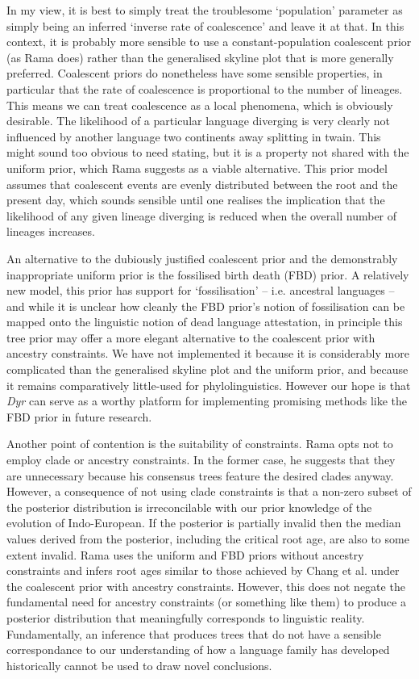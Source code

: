 \documentclass[10pt,journal,compsoc]{IEEEtran}
\begin{document}
In my view, it is best to simply treat the troublesome `population' parameter as simply being an inferred `inverse rate of coalescence' and leave it at that. In this context, it is probably more sensible to use a constant-population coalescent prior (as Rama does) rather than the generalised skyline plot that is more generally preferred. Coalescent priors do nonetheless have some sensible properties, in particular that the rate of coalescence is proportional to the number of lineages. This means we can treat coalescence as a local phenomena, which is obviously desirable. The likelihood of a particular language diverging is very clearly not influenced by another language two continents away splitting in twain. This might sound too obvious to need stating, but it is a property not shared with the uniform prior, which Rama suggests as a viable alternative. This prior model assumes that coalescent events are evenly distributed between the root and the present day, which sounds sensible until one realises the implication that the likelihood of any given lineage diverging is reduced when the overall number of lineages increases.

An alternative to the dubiously justified coalescent prior and the demonstrably inappropriate uniform prior is the fossilised birth death (FBD) prior. A relatively new model, this prior has support for `fossilisation' -- i.e. ancestral languages -- and while it is unclear how cleanly the FBD prior's notion of fossilisation can be mapped onto the linguistic notion of dead language attestation, in principle this tree prior may offer a more elegant alternative to the coalescent prior with ancestry constraints. We have not implemented it because it is considerably more complicated than the generalised skyline plot and the uniform prior, and because it remains comparatively little-used for phylolinguistics. However our hope is that  \textit{Dyr} can serve as a worthy platform for implementing promising methods like the FBD prior in future research.

Another point of contention is the suitability of constraints. Rama opts not to employ clade or ancestry constraints. In the former case, he suggests that they are unnecessary because his consensus trees feature the desired clades anyway. However, a consequence of not using clade constraints is that a non-zero subset of the posterior distribution is irreconcilable with our prior knowledge of the evolution of Indo-European. If the posterior is partially invalid then the median values derived from the posterior, including the critical root age, are also to some extent invalid. Rama uses the uniform and FBD priors without ancestry constraints and infers root ages similar to those achieved by Chang et al. under the coalescent prior with ancestry constraints. However, this does not negate the fundamental need for ancestry constraints (or something like them) to produce a posterior distribution that meaningfully corresponds to linguistic reality. Fundamentally, an inference that produces trees that do not have a sensible correspondance to our understanding of how a language family has developed historically cannot be used to draw novel conclusions.
\end{document}

